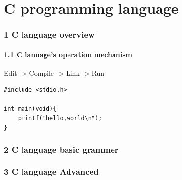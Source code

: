 \part*{C programming language}

\section*{1 C language overview}

\subsection*{1.1 C lanuage's operation mechanism}

Edit -> Compile -> Link -> Run

\begin{verbatim}
#include <stdio.h>

int main(void){
	printf("hello,world\n");
}
\end{verbatim}

\section*{2 C language basic grammer}

\section*{3 C language Advanced}
